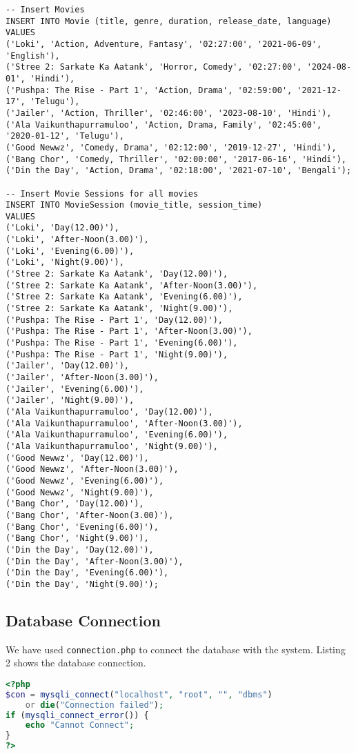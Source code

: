 \documentclass[a4paper,12pt]{article}  %
\begin{document}
\begin{lstlisting}
-- Insert Movies
INSERT INTO Movie (title, genre, duration, release_date, language)
VALUES 
('Loki', 'Action, Adventure, Fantasy', '02:27:00', '2021-06-09', 'English'),
('Stree 2: Sarkate Ka Aatank', 'Horror, Comedy', '02:27:00', '2024-08-01', 'Hindi'),
('Pushpa: The Rise - Part 1', 'Action, Drama', '02:59:00', '2021-12-17', 'Telugu'),
('Jailer', 'Action, Thriller', '02:46:00', '2023-08-10', 'Hindi'),
('Ala Vaikunthapurramuloo', 'Action, Drama, Family', '02:45:00', '2020-01-12', 'Telugu'),
('Good Newwz', 'Comedy, Drama', '02:12:00', '2019-12-27', 'Hindi'),
('Bang Chor', 'Comedy, Thriller', '02:00:00', '2017-06-16', 'Hindi'),
('Din the Day', 'Action, Drama', '02:18:00', '2021-07-10', 'Bengali');

-- Insert Movie Sessions for all movies
INSERT INTO MovieSession (movie_title, session_time)
VALUES 
('Loki', 'Day(12.00)'),
('Loki', 'After-Noon(3.00)'),
('Loki', 'Evening(6.00)'),
('Loki', 'Night(9.00)'),
('Stree 2: Sarkate Ka Aatank', 'Day(12.00)'),
('Stree 2: Sarkate Ka Aatank', 'After-Noon(3.00)'),
('Stree 2: Sarkate Ka Aatank', 'Evening(6.00)'),
('Stree 2: Sarkate Ka Aatank', 'Night(9.00)'),
('Pushpa: The Rise - Part 1', 'Day(12.00)'),
('Pushpa: The Rise - Part 1', 'After-Noon(3.00)'),
('Pushpa: The Rise - Part 1', 'Evening(6.00)'),
('Pushpa: The Rise - Part 1', 'Night(9.00)'),
('Jailer', 'Day(12.00)'),
('Jailer', 'After-Noon(3.00)'),
('Jailer', 'Evening(6.00)'),
('Jailer', 'Night(9.00)'),
('Ala Vaikunthapurramuloo', 'Day(12.00)'),
('Ala Vaikunthapurramuloo', 'After-Noon(3.00)'),
('Ala Vaikunthapurramuloo', 'Evening(6.00)'),
('Ala Vaikunthapurramuloo', 'Night(9.00)'),
('Good Newwz', 'Day(12.00)'),
('Good Newwz', 'After-Noon(3.00)'),
('Good Newwz', 'Evening(6.00)'),
('Good Newwz', 'Night(9.00)'),
('Bang Chor', 'Day(12.00)'),
('Bang Chor', 'After-Noon(3.00)'),
('Bang Chor', 'Evening(6.00)'),
('Bang Chor', 'Night(9.00)'),
('Din the Day', 'Day(12.00)'),
('Din the Day', 'After-Noon(3.00)'),
('Din the Day', 'Evening(6.00)'),
('Din the Day', 'Night(9.00)');
\end{lstlisting}


\subsection{Database Connection}
We have used \texttt{connection.php} to connect the database with the system. Listing 2 shows the database connection.

\begin{lstlisting}[language=PHP, caption={Database Connection}, label={lst:db_connect}]
<?php
$con = mysqli_connect("localhost", "root", "", "dbms")
    or die("Connection failed");
if (mysqli_connect_error()) {
    echo "Cannot Connect";
}
?>
\end{lstlisting}
\end{document}
